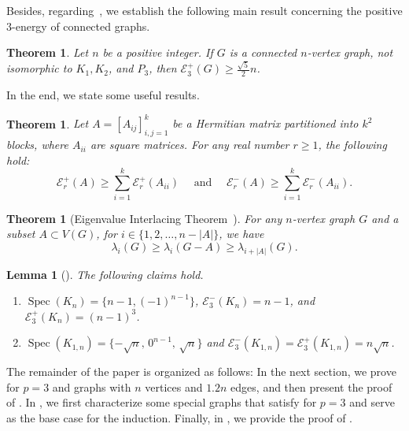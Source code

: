 \documentclass[a4paper,12pt]{article}
\theoremstyle{plain}
\newtheorem{theorem}[thm]{Theorem}
\newtheorem{lemma}[thm]{Lemma}
\newcommand{\Zhou}[1]{{\color{orange} [Zhou: #1]}}
\begin{document}
\medskip
Besides, regarding~, we establish the following main result concerning the positive $3$-energy of connected graphs. %

\begin{theorem}\label{thm:positive-main}
Let $n$ be a positive integer. If $G$ is a connected $n$-vertex graph, not isomorphic to $K_1,K_2$, and $P_3$, then $\mathcal{E}_3^{+}(G)  \geq \frac{\sqrt{5}}{2}n$.
\end{theorem}


In the end, we state some useful results. 

\begin{theorem}{\rm \cite{AKBARI202596}}\label{thm: additivity}
    Let $A = [A_{ij}]_{i,j=1}^k$ be a Hermitian matrix partitioned into $k^2$ blocks, where $A_{ii}$ are square matrices. For any real number $r \geq 1$, the following hold: $$\mathcal{E}_r^+(A) \geq \sum_{i=1}^k \mathcal{E}_r^+(A_{ii}) \quad\text{~and~}  \quad\mathcal{E}_r^-(A) \geq \sum_{i=1}^k \mathcal{E}_r^-(A_{ii}).$$
\end{theorem}

\begin{theorem}[Eigenvalue Interlacing Theorem~{\cite{CRS2010}}]\label{thm:alternate} 
For any $n$-vertex graph $G$ and a subset $A\subset V(G)$, for $i \in \{1, 2, \ldots, n-|A|\}$, we have $$\lambda_i(G)\geq \lambda_i(G-A)\geq\lambda_{i+|A|}(G).$$
\end{theorem}

\begin{lemma}[\cite{CRS2010}]\label{lem:complete graph+star+cycle} 
The following claims hold.
\begin{enumerate}[label=(\arabic*)]
\setlength{\itemsep}{0em}
    \item\label{Kn} $\operatorname{Spec}(K_n)=\{n-1,(-1)^{n-1}\}$, $\mathcal{E}_3^-(K_n)=n-1$, and $ \mathcal{E}_3^+(K_n)=(n-1)^3$.
    \item\label{K1n} $\operatorname{Spec}(K_{1,n})=\{-\sqrt{n},\, 0^{n-1},\, \sqrt{n}\}$ and  $\mathcal{E}_3^-(K_{1,n})=\mathcal{E}_3^+(K_{1,n})=n\sqrt{n}$.
\end{enumerate}
\end{lemma}


The remainder of the paper is organized as follows: In the next section, we prove  for $p=3$ and graphs with $n$ vertices and $1.2n$ edges, and then present the proof of . In , we first characterize some special graphs that satisfy  for $p=3$ and serve as the base case for the induction. Finally, in , we provide the proof of .
\end{document}
